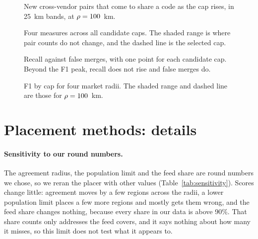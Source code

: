 \documentclass[10pt,twocolumn]{article}
\begin{document}
\begin{figure}[htbp]
\centering

\caption{New cross-vendor pairs that come to share a code as the cap rises, in 25~km bands, at $\rho=\capRadius$~km.}
\label{fig:capbands}
\end{figure}

\begin{figure}[htbp]
\centering

\caption{Four measures across all candidate caps. The shaded range is where pair counts do not change, and the dashed line is the selected cap.}
\label{fig:capmeasures}
\end{figure}

\begin{figure}[htbp]
\centering

\caption{Recall against false merges, with one point for each candidate cap. Beyond the F1 peak, recall does not rise and false merges do.}
\label{fig:captradeoff}
\end{figure}

\begin{figure}[htbp]
\centering

\caption{F1 by cap for four market radii. The shaded range and dashed line are those for $\rho=\capRadius$~km.}
\label{fig:capf1}
\end{figure}

\begin{table}[htbp]
\centering
\small

\caption{Results by market radius.}
\label{tab:capradius}
\end{table}

\begin{table}[htbp]
\centering
\small

\caption{F1 peak at $\rho=\capRadius$~km on subsets.}
\label{tab:capstability}
\end{table}

\begin{table}[htbp]
\centering
\small

\caption{Regions a \capUsed{}~km cap moves off their hub, with distances in kilometres.}
\label{tab:capmoved}
\end{table}

\clearpage
\section{Placement methods: details}
\label{app:methods}

\paragraph{Sensitivity to our round numbers.} The agreement radius, the population limit and the feed share are round numbers we chose, so we reran the placer with other values (Table~\ref{tab:sensitivity}). Scores change little: agreement moves by a few regions across the radii, a lower population limit places a few more regions and mostly gets them wrong, and the feed share changes nothing, because every share in our data is above 90\%. That share counts only addresses the feed covers, and it says nothing about how many it misses, so this limit does not test what it appears to.
\end{document}
